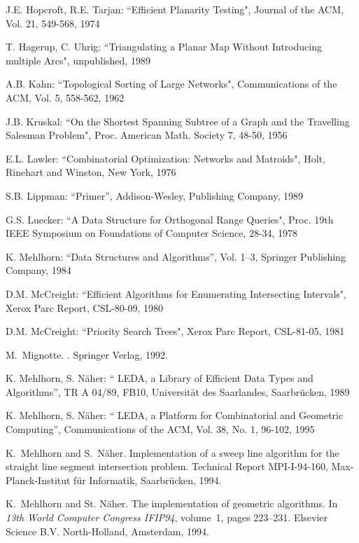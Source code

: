 \begin{thebibliography}{99}
{J.E. Hopcroft, R.E. Tarjan: ``Efficient Planarity Testing", Journal of
 the ACM, Vol. 21, 549-568, 1974}

{T. Hagerup, C. Uhrig: ``Triangulating a Planar Map Without Introducing
 multiple Arcs", unpublished, 1989 }

{A.B. Kahn: ``Topological Sorting of Large Networks", Communications of the
 ACM, Vol. 5, 558-562, 1962}

{J.B. Kruskal: ``On the Shortest Spanning Subtree of a Graph and the Travelling
 Salesman Problem", Proc. American Math. Society 7, 48-50, 1956}

{E.L. Lawler: 
``Combinatorial Optimization: Networks and Matroids", 
Holt, Rinehart and Winston, New York, 1976}

{S.B. Lippman: ``\CC Primer'', Addison-Wesley, Publishing Company, 1989}

{G.S. Luecker: ``A Data Structure for Orthogonal Range Queries", 
Proc. 19th IEEE Symposium on Foundations of Computer Science, 28-34, 1978}

{K. Mehlhorn: ``Data Structures and Algorithms'', Vol. 1--3,
Springer Publishing Company, 1984}

{D.M. McCreight: ``Efficient Algorithms for Enumerating Intersecting Intervals",
 Xerox Parc Report, CSL-80-09, 1980}

{D.M. McCreight: ``Priority Search Trees", Xerox Parc Report, CSL-81-05, 1981}

M.~Mignotte.
.
\newblock Springer Verlag, 1992.

{K. Mehlhorn, S. N\"aher: `` LEDA, a Library of Efficient Data Types and
Algorithms'', TR A 04/89, FB10, Universit\"at des Saarlandes, 
Saarbr\"ucken, 1989}

{K. Mehlhorn, S. N\"aher: `` LEDA, a Platform for Combinatorial and Geometric 
Computing'', Communications of the ACM, Vol. 38, No. 1, 96-102, 1995 }

K.~Mehlhorn and S.~N\"aher.
\newblock Implementation of a sweep line algorithm for the straight line
  segment intersection problem.
\newblock Technical Report MPI-I-94-160, Max-Planck-Institut f\"ur Informatik,
  Saarbr\"ucken, 1994.

K.~Mehlhorn and St. N\"aher.
\newblock The implementation of geometric algorithms.
\newblock In {\em 13th World Computer Congress IFIP94}, volume~1, pages
  223--231. Elsevier Science B.V. North-Holland, Amsterdam, 1994.


\end{thebibliography}
